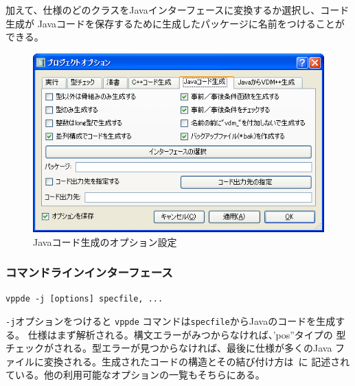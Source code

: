 \documentclass[\pformat,12pt]{jarticle}
\newcommand{\vdmde}{vppde}
\begin{document}
加えて、仕様のどのクラスをJavaインターフェースに変換するか選択し、コード生成が
Javaコードを保存するために生成したパッケージに名前をつけることができる。

\begin{figure}[tbh]
\begin{center}
\includegraphics[width=12cm]{jcgOptions-pp.png}
\caption{Javaコード生成のオプション設定}
\label{fig:optjcg}
\end{center}
\end{figure}

\subsubsection{コマンドラインインターフェース}

{\tt \vdmde\ -j [options] specfile, ...}


{\tt -j}オプションをつけると {\tt \vdmde} コマンドは{\tt specfile}からJavaのコードを生成する。
仕様はまず解析される。構文エラーがみつからなければ、'pos''タイプの 
型チェックがされる。型エラーが見つからなければ、最後に仕様が多くのJava
ファイルに変換される。生成されたコードの構造とその結び付け方は~\cite{CGJavaManPP-SCSK}に
記述されている。他の利用可能なオプションの一覧もそちらにある。
\end{document}
